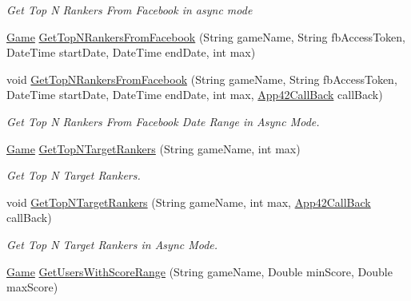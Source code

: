 \begin{DoxyCompactItemize}
\begin{DoxyCompactList}\small\item\em Get Top N Rankers From Facebook in async mode \end{DoxyCompactList}\item 
\hyperlink{classcom_1_1shephertz_1_1app42_1_1paas_1_1sdk_1_1csharp_1_1game_1_1_game}{Game} \hyperlink{classcom_1_1shephertz_1_1app42_1_1paas_1_1sdk_1_1csharp_1_1game_1_1_score_board_service_a0cee693789ef136b76c1cefcaa1a91d1}{Get\+Top\+N\+Rankers\+From\+Facebook} (String game\+Name, String fb\+Access\+Token, Date\+Time start\+Date, Date\+Time end\+Date, int max)
\item 
void \hyperlink{classcom_1_1shephertz_1_1app42_1_1paas_1_1sdk_1_1csharp_1_1game_1_1_score_board_service_a410c98997e197c761081f133ddfe8055}{Get\+Top\+N\+Rankers\+From\+Facebook} (String game\+Name, String fb\+Access\+Token, Date\+Time start\+Date, Date\+Time end\+Date, int max, \hyperlink{interfacecom_1_1shephertz_1_1app42_1_1paas_1_1sdk_1_1csharp_1_1_app42_call_back}{App42\+Call\+Back} call\+Back)
\begin{DoxyCompactList}\small\item\em Get Top N Rankers From Facebook Date Range in Async Mode. \end{DoxyCompactList}\item 
\hyperlink{classcom_1_1shephertz_1_1app42_1_1paas_1_1sdk_1_1csharp_1_1game_1_1_game}{Game} \hyperlink{classcom_1_1shephertz_1_1app42_1_1paas_1_1sdk_1_1csharp_1_1game_1_1_score_board_service_ae66ea9ab792755bbe7b96ac545c3d0c6}{Get\+Top\+N\+Target\+Rankers} (String game\+Name, int max)
\begin{DoxyCompactList}\small\item\em Get Top N Target Rankers. \end{DoxyCompactList}\item 
void \hyperlink{classcom_1_1shephertz_1_1app42_1_1paas_1_1sdk_1_1csharp_1_1game_1_1_score_board_service_a001d5ae6533da63e1f2a092eef5f4013}{Get\+Top\+N\+Target\+Rankers} (String game\+Name, int max, \hyperlink{interfacecom_1_1shephertz_1_1app42_1_1paas_1_1sdk_1_1csharp_1_1_app42_call_back}{App42\+Call\+Back} call\+Back)
\begin{DoxyCompactList}\small\item\em Get Top N Target Rankers in Async Mode. \end{DoxyCompactList}\item 
\hyperlink{classcom_1_1shephertz_1_1app42_1_1paas_1_1sdk_1_1csharp_1_1game_1_1_game}{Game} \hyperlink{classcom_1_1shephertz_1_1app42_1_1paas_1_1sdk_1_1csharp_1_1game_1_1_score_board_service_a3adf292139a574c114e85bae66c80ea0}{Get\+Users\+With\+Score\+Range} (String game\+Name, Double min\+Score, Double max\+Score)

\end{DoxyCompactItemize}
